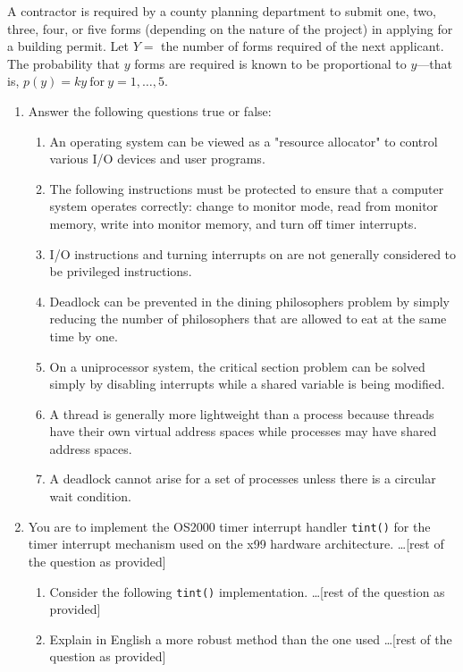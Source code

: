 \documentclass[letterpaper,12pt,addpoints]{exam}
\begin{document}
\clearpage
\begin{questions}
\question
A contractor is required by a county planning department to submit one, two, three, four, or five forms (depending on the nature of the project) in applying for a building permit. Let $Y=$ the number of forms required of the next applicant. The probability that $y$ forms are required is known to be proportional to $y$---that is, $p(y)=ky\ \text{for}\ y=1,\dots,5.$

\begin{enumerate}
    \item Answer the following questions true or false:
    \begin{enumerate}
        \item An operating system can be viewed as a "resource allocator" to control various I/O devices and user programs.
        \item The following instructions must be protected to ensure that a computer system operates correctly: change to monitor mode, read from monitor memory, write into monitor memory, and turn off timer interrupts.
        \item I/O instructions and turning interrupts on are not generally considered to be privileged instructions.
        \item Deadlock can be prevented in the dining philosophers problem by simply reducing the number of philosophers that are allowed to eat at the same time by one.
        \item On a uniprocessor system, the critical section problem can be solved simply by disabling interrupts while a shared variable is being modified.
        \item A thread is generally more lightweight than a process because threads have their own virtual address spaces while processes may have shared address spaces.
        \item A deadlock cannot arise for a set of processes unless there is a circular wait condition.
    \end{enumerate}
    \item You are to implement the OS2000 timer interrupt handler \texttt{tint()} for the timer interrupt mechanism used on the x99 hardware architecture. \ldots [rest of the question as provided]
    \begin{enumerate}
        \item Consider the following \texttt{tint()} implementation. \ldots [rest of the question as provided]
        \item Explain in English a more robust method than the one used \ldots [rest of the question as provided]

\end{enumerate}
\end{enumerate}
\end{questions}
\end{document}
